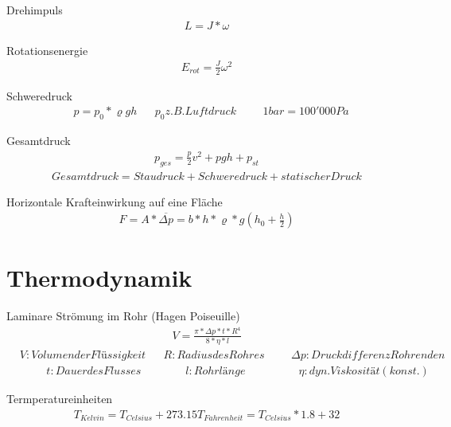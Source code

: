 \documentclass[17pt]{extarticle}
\begin{document}
	Drehimpuls 
	\begin{align}
		L = J * \omega
	\end{align}
	
	Rotationsenergie
	\begin{align}
		E_{rot} = \frac{J}{2} \omega^2
	\end{align}
	
	Schweredruck 
	\begin{align}
		&p = p_0 * \varrho g h
		&&p_0 z.B. Luftdruck 
		&&&1 bar = 100'000 Pa
	\end{align}
	
	Gesamtdruck
	\begin{align}
		p_{ges} = \frac{p}{2}v^2 + pgh + p_{st}
	\end{align}
	\begin{align}		
		Gesamtdruck = Staudruck + Schweredruck + statischer Druck
	\end{align}

	Horizontale Krafteinwirkung auf eine Fläche
	\begin{align}
		F = A * \overline{\Delta p} = b*h * \varrho*g (h_{0} + \frac{h}{2})
	\end{align}
	
	
\section{Thermodynamik}
	Laminare Strömung im Rohr (Hagen Poiseuille)
	\begin{align}
		V = \frac{\pi * \Delta p * t * R^4}{8 * \eta * l}
	\end{align}
	\begin{align}
		&V: Volumen der Flüssigkeit
		&&R: Radius des Rohres
		&&&\Delta p: Druckdifferenz Rohrenden
	\end{align}
	\begin{align}
		&&&&t: Dauer des Flusses
		&&&&&l: Rohrlänge
		&&&&&&\eta: dyn. Viskosität (konst.)
	\end{align}

	Termperatureinheiten
	\begin{align}
		T_{Kelvin} = T_{Celsius} + 273.15
		T_{Fahrenheit} = T_{Celsius} * 1.8 + 32
	\end{align}
\end{document}
